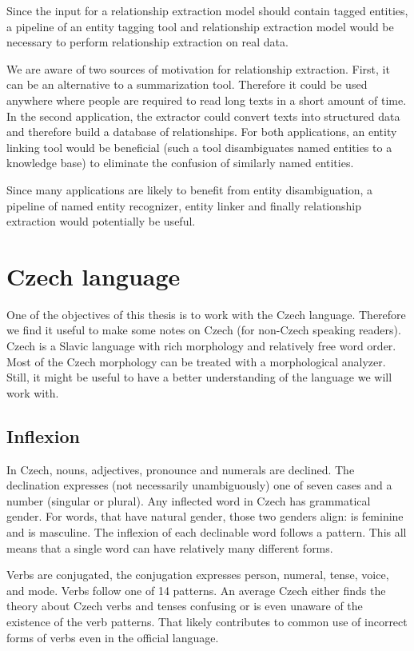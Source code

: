 Since the input for a relationship extraction model should contain tagged entities, a pipeline of an entity tagging tool and relationship extraction model would be necessary to perform relationship extraction on real data. 

We are aware of two sources of motivation for relationship extraction. First, it can be an alternative to a summarization tool. Therefore it could be used anywhere where people are required to read long texts in a short amount of time. In the second application, the extractor could convert texts into structured data and therefore build a database of relationships. For both applications, an entity linking tool would be beneficial (such a tool disambiguates named entities to a knowledge base) to eliminate the confusion of similarly named entities.

\label{sec:relation_extraction_pipeline_proposal}
Since many applications are likely to benefit from entity disambiguation, a pipeline of named entity recognizer, entity linker and finally relationship extraction would potentially be useful.

\section{Czech language}
One of the objectives of this thesis is to work with the Czech language. Therefore we find it useful to make some notes on Czech (for non-Czech speaking readers). Czech is a Slavic language with rich morphology and relatively free word order. Most of the Czech morphology can be treated with a morphological analyzer. Still, it might be useful to have a better understanding of the language we will work with.

\subsection{Inflexion}
In Czech, nouns, adjectives, pronounce and numerals are declined. The declination expresses (not necessarily unambiguously) one of seven cases and a number (singular or plural). Any inflected word in Czech has grammatical gender. For words, that have natural gender, those two genders align:   is feminine and   is masculine. The inflexion of each declinable word follows a pattern. This all means that a single word can have relatively many different forms.

Verbs are conjugated, the conjugation expresses person, numeral, tense, voice, and mode. Verbs follow one of 14 patterns. An average Czech either finds the theory about Czech verbs and tenses confusing or is even unaware of the existence of the verb patterns. That likely contributes to common use of incorrect forms of verbs even in the official language.

